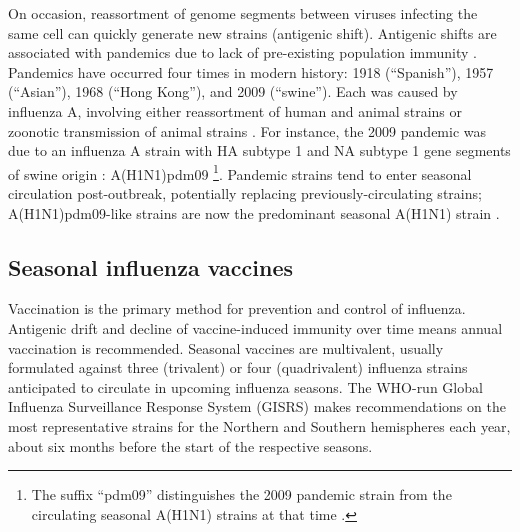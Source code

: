 On occasion, reassortment of genome segments between viruses infecting the same cell can quickly generate new strains (antigenic shift).
Antigenic shifts are associated with pandemics due to lack of pre-existing population immunity \autocite{krammer2018Influenza}.
Pandemics have occurred four times in modern history: 1918 (\enquote{Spanish}), 1957 (\enquote{Asian}), 1968 (\enquote{Hong Kong}), and 2009 (\enquote{swine}).
Each was caused by influenza A, involving either reassortment of human and animal strains or zoonotic transmission of animal strains \autocite{short2018BackFutureLessons}.
%
For instance, the 2009 pandemic was due to an influenza A strain with \gls{HA} subtype 1 and \gls{NA} subtype 1 gene segments of swine origin \autocite{garten2009AntigenicGeneticCharacteristics}: A(H1N1)pdm09%
\footnote{
    The suffix \enquote{pdm09} distinguishes the 2009 pandemic strain from the circulating seasonal A(H1N1) strains at that time \autocite{worldhealthorganization2011StandardizationTerminologyPandemic}.
}.
Pandemic strains tend to enter seasonal circulation post-outbreak, potentially replacing previously-circulating strains;
A(H1N1)pdm09-like strains are now the predominant seasonal A(H1N1) strain \autocite{krammer2018Influenza}.
%

\subsection{Seasonal influenza vaccines}

Vaccination is the primary method for prevention and control of influenza.
Antigenic drift and decline of vaccine-induced immunity over time means annual vaccination is recommended.
Seasonal vaccines are multivalent, usually formulated against three (trivalent) or four (quadrivalent) influenza strains anticipated to circulate in upcoming influenza seasons.
The \gls{WHO}-run Global Influenza Surveillance Response System (GISRS) makes recommendations on the most representative strains for the Northern and Southern hemispheres each year, about six months before the start of the respective seasons.


